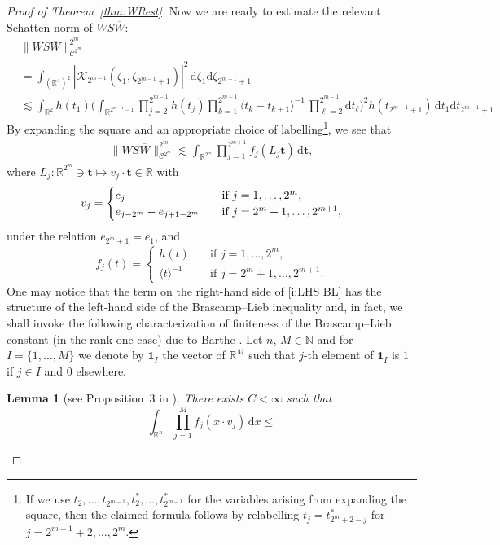 \documentclass[a4paper]{amsart}
\numberwithin{equation}{section}%
\theoremstyle{plain}%
\newtheorem{lemma}[theorem]{Lemma}
\theoremstyle{definition}
\theoremstyle{remark}%
\def\d{\mathrm{d}}
\def\C{\mathcal{C}}
\def\K{\mathcal{K}}
\def\C{\mathcal{C}}
\def\K{\mathcal{K}}
\newcommand{\N}{{\mathbb N}}
\begin{document}
\begin{proof}[Proof of Theorem~\ref{thm:WRest}]
Now we are ready to estimate the relevant Schatten norm of $WS\overline{W}$:
\begin{align*}
& \|WS\overline{W}\|_{\C^{2^{m}}}^{2^{m}}\\
&=\int_{(\mathbb{R}^4)^2} |\K_{2^{m-1}}(\zeta_1,\zeta_{2^{m-1}+1})|^2 \, \d\zeta_1 \d\zeta_{2^{m-1}+1}   \\
&\lesssim \int_{\mathbb{R}^2} h(t_1) \bigg(\int_{\mathbb{R}^{2^{m-1}-1}} \prod_{j=2}^{2^{m-1}} h(t_j)  \prod_{k=1}^{2^{m-1}} \langle t_k-t_{k + 1} \rangle^{-1} \, \prod_{\ell = 2}^{2^{m-1}} \d t_\ell  \bigg)^2 h(t_{2^{m-1}+1}) \, \d t_1 \d t_{2^{m-1}+1}
\end{align*}
By expanding the square and an appropriate choice of labelling\footnote{If we use $t_2,\ldots,t_{2^{m-1}},t^*_2,\ldots,t^*_{2^{m-1}}$ for the variables arising from expanding the square, then the claimed formula follows by relabelling $t_j = t^*_{2^m + 2-j}$ for $j = 2^{m-1}+2,\ldots,2^m$.}, we see that
\begin{align}\label{i:LHS BL}
\|WS\overline{W}\|_{\C^{2^{m}}}^{2^{m}}
\lesssim
\int_{\mathbb R^{2^{m}}}\prod_{j=1}^{2^{m+1}} f_j(L_j\textbf{t})\,\d \textbf{t},
\end{align}
where $L_j:\mathbb R^{2^{m}}\ni \textbf{t}\mapsto v_j\cdot\textbf{t}\in\mathbb R$ with
$$v_j
=
\begin{cases}
e_j \quad &\text{if $ j=1,\dots,2^{m}$},\\
e_{j-2^{m}}-e_{j+1-2^{m}} \quad &\text{if $j=2^{m}+1,\dots,2^{m+1}$}, 
\end{cases}
$$
under the relation $e_{2^{m}+1}=e_1$, and 
\[
f_j(t)
=
\begin{cases}
h(t)\quad&\text{if $j=1,\dots, 2^{m}$,}\\
\langle t \rangle^{-1}\quad &\text{if $j=2^{m}+1,\dots, 2^{m+1}$}.
\end{cases}
\] 
One may notice that the term on the right-hand side of \eqref{i:LHS BL} has the structure of the left-hand side of the Brascamp--Lieb inequality and, in fact, we shall invoke the following characterization of finiteness of the Brascamp--Lieb constant (in the rank-one case) due to Barthe \cite{Barthe98}. 
Let $n$, $M \in \N$ and for $I=\{1, \ldots, M \}$ we denote by $\textbf{1}_{I}$ the vector of $\mathbb R^{M}$ such that $j$-th element of $\textbf{1}_{I}$ is $1$ if $j\in I$ and $0$ elsewhere.
\begin{lemma}[see Proposition~3 in \cite{Barthe98}]\label{l:Barthe}
There exists $C<\infty$ such that 
\[
\int_{\mathbb R^n}\prod_{j=1}^M f_j(x\cdot v_j)\,\d x
\leq
\]
\end{lemma}
\end{proof}
\end{document}
